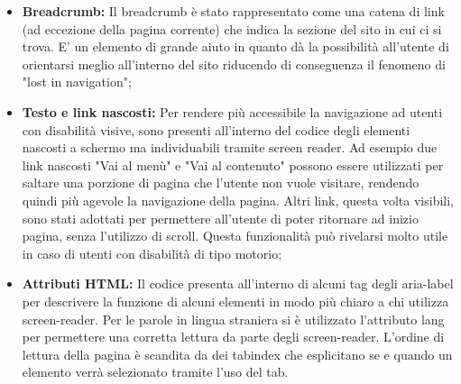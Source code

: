 \begin{itemize}
	\item \textbf{Breadcrumb:} Il breadcrumb è stato rappresentato come una catena di link (ad eccezione della pagina corrente) che indica la sezione del sito in cui ci si trova. E' un elemento di grande aiuto in quanto dà la possibilità all'utente di orientarsi meglio all'interno del sito riducendo di conseguenza il fenomeno di "lost in navigation";
	\item \textbf{Testo e link nascosti:} Per rendere più accessibile la navigazione ad utenti con disabilità visive, sono presenti all'interno del codice degli elementi nascosti a schermo ma individuabili tramite screen reader. Ad esempio due link nascosti "Vai al menù" e "Vai al contenuto" possono essere utilizzati per saltare una porzione di pagina che l'utente non vuole visitare, rendendo quindi più agevole la navigazione della pagina. Altri link, questa volta visibili, sono stati adottati per permettere all'utente di poter ritornare ad inizio pagina, senza l'utilizzo di scroll. Questa funzionalità può rivelarsi molto utile in caso di utenti con disabilità di tipo motorio;
	\item \textbf{Attributi HTML:} Il codice presenta all'interno di alcuni tag degli aria-label per descrivere la funzione di alcuni elementi in modo più chiaro a chi utilizza screen-reader.
Per le parole in lingua straniera si è utilizzato l'attributo lang per permettere una corretta lettura da parte degli screen-reader.
L'ordine di lettura della pagina è scandita da dei tabindex che esplicitano se e quando un elemento verrà selezionato tramite l'uso del tab.
\end{itemize}

